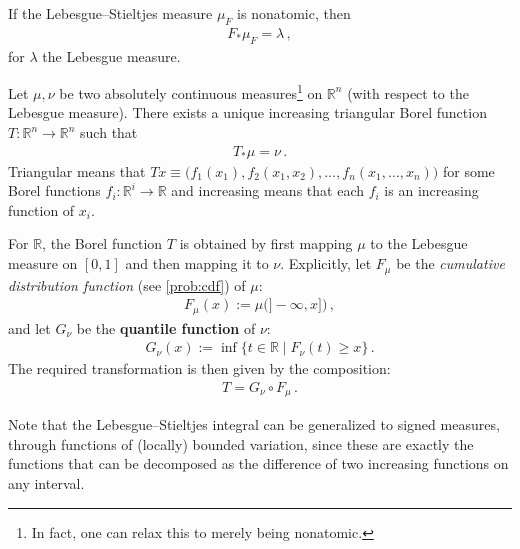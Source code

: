     \begin{property}
        If the Lebesgue--Stieltjes measure $\mu_F$ is nonatomic, then
        \begin{gather}
            F_\ast\mu_F = \lambda\,,
        \end{gather}
        for $\lambda$ the Lebesgue measure.
    \end{property}

    \begin{property}
        Let $\mu,\nu$ be two absolutely continuous measures\footnote{In fact, one can relax this to merely being nonatomic.} on $\mathbb{R}^n$ (with respect to the Lebesgue measure). There exists a unique increasing triangular Borel function $T:\mathbb{R}^n\rightarrow\mathbb{R}^n$ such that
        \begin{gather}
            T_\ast\mu = \nu\,.
        \end{gather}
        Triangular means that $Tx\equiv\bigl(f_1(x_1),f_2(x_1,x_2),\ldots,f_n(x_1,\ldots,x_n)\bigr)$ for some Borel functions $f_i:\mathbb{R}^i\rightarrow\mathbb{R}$ and increasing means that each $f_i$ is an increasing function of $x_i$.
    \end{property}
    \begin{remark}
        For $\mathbb{R}$, the Borel function $T$ is obtained by first mapping $\mu$ to the Lebesgue measure on $[0,1]$ and then mapping it to $\nu$. Explicitly, let $F_\mu$ be the \textit{cumulative distribution function} (see \cref{prob:cdf}) of $\mu$:
        \begin{gather}
            F_\mu(x) := \mu\bigl(]-\infty,x]\bigr)\,,
        \end{gather}
        and let $G_\nu$ be the \textbf{quantile function} of $\nu$:
        \begin{gather}
            G_\nu(x) := \inf\{t\in\mathbb{R}\mid F_\nu(t)\geq x\}\,.
        \end{gather}
        The required transformation is then given by the composition:
        \begin{gather}
            T = G_\nu\circ F_\mu\,.
        \end{gather}

    \end{remark}

    \begin{remark}\label{measure:bounded_variation_integral}
        Note that the Lebesgue--Stieltjes integral can be generalized to signed measures, through functions of (locally) bounded variation, since these are exactly the functions that can be decomposed as the difference of two increasing functions on any interval.
    \end{remark}
    
